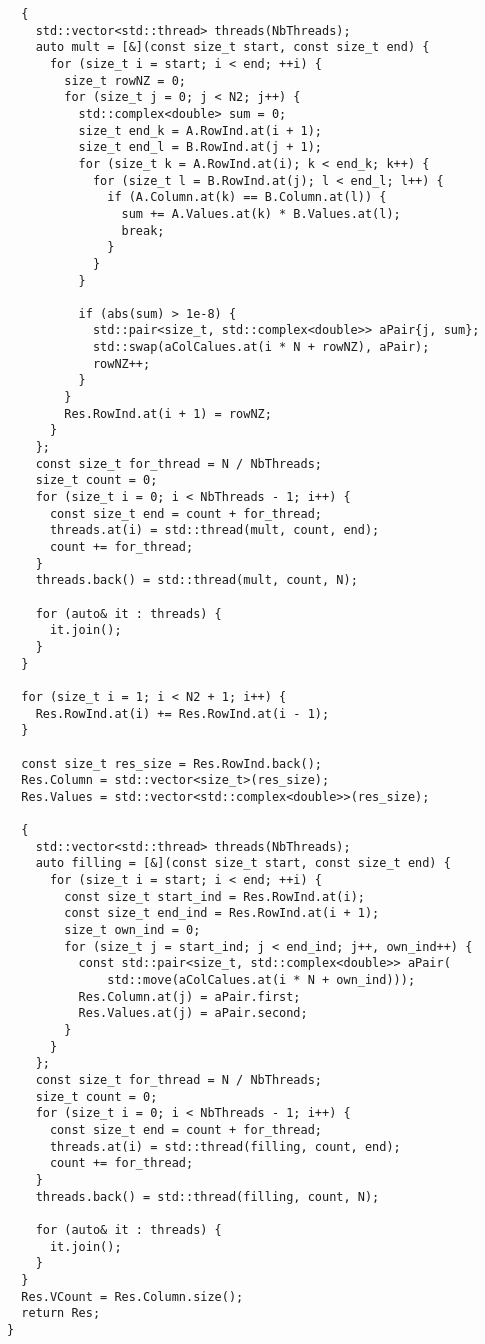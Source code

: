 \documentclass{report}
\begin{document}
\begin{lstlisting}
  {
    std::vector<std::thread> threads(NbThreads);
    auto mult = [&](const size_t start, const size_t end) {
      for (size_t i = start; i < end; ++i) {
        size_t rowNZ = 0;
        for (size_t j = 0; j < N2; j++) {
          std::complex<double> sum = 0;
          size_t end_k = A.RowInd.at(i + 1);
          size_t end_l = B.RowInd.at(j + 1);
          for (size_t k = A.RowInd.at(i); k < end_k; k++) {
            for (size_t l = B.RowInd.at(j); l < end_l; l++) {
              if (A.Column.at(k) == B.Column.at(l)) {
                sum += A.Values.at(k) * B.Values.at(l);
                break;
              }
            }
          }

          if (abs(sum) > 1e-8) {
            std::pair<size_t, std::complex<double>> aPair{j, sum};
            std::swap(aColCalues.at(i * N + rowNZ), aPair);
            rowNZ++;
          }
        }
        Res.RowInd.at(i + 1) = rowNZ;
      }
    };
    const size_t for_thread = N / NbThreads;
    size_t count = 0;
    for (size_t i = 0; i < NbThreads - 1; i++) {
      const size_t end = count + for_thread;
      threads.at(i) = std::thread(mult, count, end);
      count += for_thread;
    }
    threads.back() = std::thread(mult, count, N);

    for (auto& it : threads) {
      it.join();
    }
  }

  for (size_t i = 1; i < N2 + 1; i++) {
    Res.RowInd.at(i) += Res.RowInd.at(i - 1);
  }

  const size_t res_size = Res.RowInd.back();
  Res.Column = std::vector<size_t>(res_size);
  Res.Values = std::vector<std::complex<double>>(res_size);

  {
    std::vector<std::thread> threads(NbThreads);
    auto filling = [&](const size_t start, const size_t end) {
      for (size_t i = start; i < end; ++i) {
        const size_t start_ind = Res.RowInd.at(i);
        const size_t end_ind = Res.RowInd.at(i + 1);
        size_t own_ind = 0;
        for (size_t j = start_ind; j < end_ind; j++, own_ind++) {
          const std::pair<size_t, std::complex<double>> aPair(
              std::move(aColCalues.at(i * N + own_ind)));
          Res.Column.at(j) = aPair.first;
          Res.Values.at(j) = aPair.second;
        }
      }
    };
    const size_t for_thread = N / NbThreads;
    size_t count = 0;
    for (size_t i = 0; i < NbThreads - 1; i++) {
      const size_t end = count + for_thread;
      threads.at(i) = std::thread(filling, count, end);
      count += for_thread;
    }
    threads.back() = std::thread(filling, count, N);

    for (auto& it : threads) {
      it.join();
    }
  }
  Res.VCount = Res.Column.size();
  return Res;
}
\end{lstlisting}
\end{document}

